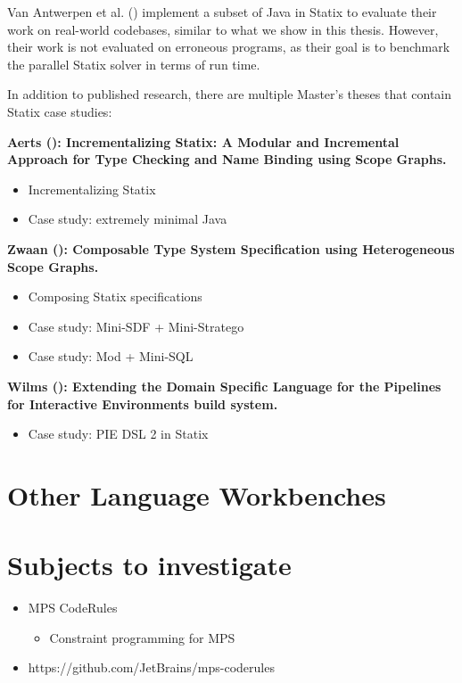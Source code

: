       Van Antwerpen et al. (\citeyear{AntwerpenV21}) implement a subset of Java in Statix to evaluate their work on real-world codebases, similar to what we show in this thesis. However, their work is not evaluated on erroneous programs, as their goal is to benchmark the parallel Statix solver in terms of run time.

      In addition to published research, there are multiple Master's theses that contain Statix case studies:

      \textbf{Aerts (\citeyear{Aerts2019}): Incrementalizing Statix: A Modular and Incremental Approach for Type Checking and Name Binding using Scope Graphs.}

      \begin{itemize}
        \item Incrementalizing Statix
        \item Case study: extremely minimal Java
      \end{itemize}
  
      \textbf{Zwaan (\citeyear{Zwaan2021}): Composable Type System Specification using Heterogeneous Scope Graphs.}
      
      \begin{itemize}
        \item Composing Statix specifications
        \item Case study: Mini-SDF + Mini-Stratego
        \item Case study: Mod + Mini-SQL
      \end{itemize}
  
      \textbf{Wilms (\citeyear{Wilms2022}): Extending the Domain Specific Language for the Pipelines for Interactive Environments build system.}

      \begin{itemize}
        \item Case study: PIE DSL 2 in Statix
      \end{itemize}
    
  \section{Other Language Workbenches}

  \section{Subjects to investigate}

    \begin{itemize}
      \item MPS CodeRules
      \begin{itemize}
        \item Constraint programming for MPS
      \end{itemize}
      \item https://github.com/JetBrains/mps-coderules
    \end{itemize}

